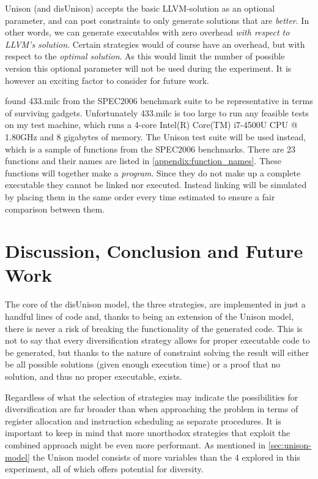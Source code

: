 
Unison (and disUnison) accepts the basic LLVM-solution as an optional parameter, and can
post constraints to only generate solutions that are \textit{better}. In other words, we
can generate executables with zero overhead \textit{with respect to LLVM's solution}.
Certain strategies would of course have an overhead, but with respect to the
\textit{optimal solution}. As this would limit the number of possible version this
optional parameter will not be used during the experiment. It is however an exciting
factor to consider for future work.

\textcite{large-scale-automated} found 433.milc from the SPEC2006 benchmark suite to be
representative in terms of surviving gadgets. Unfortunately 433.milc is too large to run
any feasible tests on my test machine, which runs a 4-core Intel(R) Core(TM) i7-4500U CPU
@ 1.80GHz and 8 gigabytes of memory. The Unison test suite will be used instead, which is
a sample of functions from the SPEC2006 benchmarks. There are 23 functions and their names
are listed in \ref{appendix:function_names}. These functions will together make a
\textit{program}. Since they do not make up a complete executable they cannot be linked
nor executed. Instead linking will be simulated by placing them in the same order every time
estimated to ensure a fair comparison between them.

\chapter{Discussion, Conclusion and Future Work}

The core of the disUnison model, the three strategies, are implemented in just a handful
lines of code and, thanks to being an extension of the Unison model, there is never a risk
of breaking the functionality of the generated code. This is not to say that every
diversification strategy allows for proper executable code to be generated, but thanks to
the nature of constraint solving the result will either be all possible solutions
(given enough execution time) or a proof that no solution, and thus no proper executable,
exists.

Regardless of what the selection of strategies may indicate the possibilities for
diversification are far broader than when approaching the problem in terms of register
allocation and instruction scheduling as separate procedures. It is important to keep in
mind that more unorthodox strategies that exploit the combined approach might be even
more performant. As mentioned in \ref{sec:unison-model} the Unison model consists of more
variables than the 4 explored in this experiment, all of which offers potential for
diversity.

